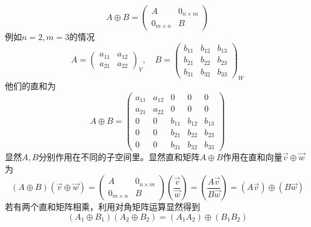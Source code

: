 \documentclass[a4paper,11pt]{article}
\begin{document}
    \begin{equation}
        A \oplus B=\left(\begin{array}{c|c}
            A & 0_{n \times m} \\
            \hline 0_{m \times n} & B
            \end{array}\right)
    \end{equation}
    例如$n=2,m=3$的情况
    \begin{equation}
        A=\left(\begin{array}{cc}
            a_{11} & a_{12} \\
            a_{21} & a_{22}
            \end{array}\right)_{V}, \quad B=\left(\begin{array}{ccc}
            b_{11} & b_{12} & b_{13} \\
            b_{21} & b_{22} & b_{23} \\
            b_{31} & b_{32} & b_{33}
            \end{array}\right)_{W}
    \end{equation}
    他们的直和为
    \begin{equation}
        A \oplus B=\left(\begin{array}{cc|ccc}
            a_{11} & a_{12} & 0 & 0 & 0 \\
            a_{21} & a_{22} & 0 & 0 & 0 \\
            \hline 0 & 0 & b_{11} & b_{12} & b_{13} \\
            0 & 0 & b_{21} & b_{22} & b_{23} \\
            0 & 0 & b_{31} & b_{32} & b_{33}
            \end{array}\right)
    \end{equation}
    显然$A,B$分别作用在不同的子空间里。显然直和矩阵$A\oplus B$作用在直和向量$\vec{v} \oplus \vec{w}$为
    \begin{equation}
        (A \oplus B)(\vec{v} \oplus \vec{w})=\left(\begin{array}{c|c}
            A & 0_{n \times m} \\
            \hline 0_{m \times n} & B
            \end{array}\right)\left(\frac{\vec{v}}{\vec{w}}\right)=\left(\frac{A \vec{v}}{B \vec{w}}\right)=(A \vec{v}) \oplus(B \vec{w})
    \end{equation}
    若有两个直和矩阵相乘，利用对角矩阵运算显然得到
    \begin{equation}
        \left(A_{1} \oplus B_{1}\right)\left(A_{2} \oplus B_{2}\right)=\left(A_{1} A_{2}\right) \oplus\left(B_{1} B_{2}\right)
    \end{equation}
\end{document}
